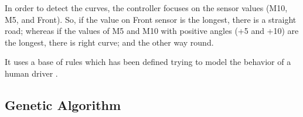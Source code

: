 \documentclass[conference]{IEEEtran}
\begin{document}
In order to detect the curves, the controller focuses on the sensor values (M10, M5, and Front). So, if the value on Front sensor is the longest, there is a straight road; whereas if the values of M5 and M10 with positive angles (+5 and +10) are the longest, there is right curve; and the other way round.

It uses a base of rules which has been defined trying to model the behavior of a human driver \cite{evo17}.







\subsection{Genetic Algorithm}
\label{subsec:GA_optimization}

\end{document}
